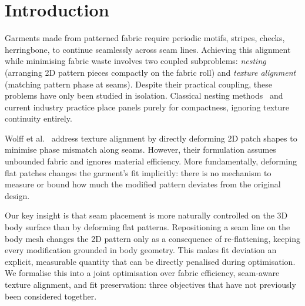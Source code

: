 \section{Introduction}
\label{sec:introduction}

Garments made from patterned fabric require periodic motifs, stripes,
checks, herringbone, to continue seamlessly across seam lines.
Achieving this alignment while minimising fabric waste involves two coupled
subproblems: \emph{nesting} (arranging 2D pattern pieces compactly on the
fabric roll) and \emph{texture alignment} (matching pattern phase at seams).
Despite their practical coupling, these problems have only been studied in
isolation.
Classical nesting methods~\cite{BennellO08} and current industry practice
place panels purely for compactness, ignoring texture continuity entirely.

Wolff et al.~\cite{WolffS19} address texture alignment by directly
deforming 2D patch shapes to minimise phase mismatch along seams.
However, their formulation assumes unbounded fabric and ignores material
efficiency.
More fundamentally, deforming flat patches changes the garment's fit
implicitly: there is no mechanism to measure or bound how much the modified
pattern deviates from the original design.

Our key insight is that seam placement is more naturally controlled on the
3D body surface than by deforming flat patterns.
Repositioning a seam line on the body mesh changes the 2D pattern only as a
consequence of re-flattening, keeping every modification grounded in body
geometry.
This makes fit deviation an explicit, measurable quantity that can be
directly penalised during optimisation.
We formalise this into a joint optimisation over fabric efficiency,
seam-aware texture alignment, and fit preservation: three objectives that
have not previously been considered together.


